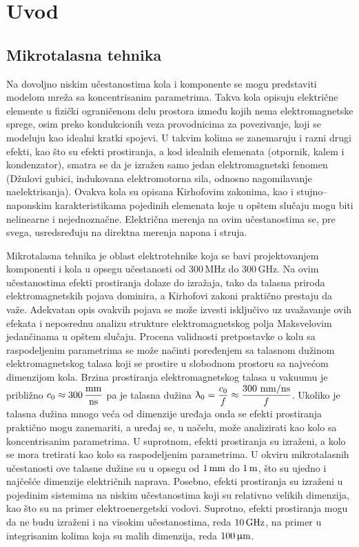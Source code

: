 \documentclass[a4paper, 12pt, diplomski]{etf}
\renewcommand{\unit}[1]{\,{\rm #1}}   %
\newcommand{\DS}{\displaystyle}
\begin{document}
\newpage

\section{Uvod}
\subsection{Mikrotalasna tehnika}
Na dovoljno niskim učestanostima kola i komponente se mogu predstaviti modelom mreža sa koncentrisanim 
parametrima. Takva kola opisuju električne elemente u fizički ograničenom delu prostora između kojih nema elektromagnetske sprege, osim preko kondukcionih veza provodnicima za povezivanje, koji se
modeluju kao idealni kratki spojevi. 
U takvim kolima se zanemaruju i razni drugi 
efekti, kao što su efekti prostiranja, a kod 
idealnih elemenata (otpornik, kalem i 
kondenzator), smatra se da je izražen samo 
jedan elektromagnetski fenomen (Džulovi gubici, indukovana elektromotorna sila, odnosno nagomilavanje naelektrisanja).
Ovakva kola su opisana 
Kirhofovim zakonima, kao i stujno--naponskim karakteristikama
pojedinih elemenata koje u opštem slučaju mogu biti 
nelinearne i nejednoznačne. Električna merenja na ovim učestanostima 
se, pre svega, usredsređuju na direktna merenja napona i struja.

Mikrotalasna tehnika je oblast elektrotehnike koja se bavi projektovanjem komponenti
i kola u opsegu učestanosti od 300\,MHz do 300\,GHz. Na ovim učestanostima
efekti prostiranja dolaze do izražaja, tako da talasna priroda elektromagnetskih pojava dominira,
a Kirhofovi zakoni praktično prestaju da važe. Adekvatan opis ovakvih pojava se može izvesti isključivo 
uz uvažavanje ovih efekata i neposrednu analizu strukture elektromagnetskog polja Maksvelovim 
jedančinama u opštem slučaju. 
Procena validnosti pretpostavke o kolu sa raspodeljenim parametrima se može načinti poređenjem sa talasnom dužinom elektromagnetskog talasa koji se prostire u slobodnom prostoru sa najvećom dimenzijom kola.
Brzina prostiranja elektromagnetskog talasa u vakuumu je približno $c_0 \approx 300\unit{\dfrac{mm}{ns}}$
pa je talasna dužina 
$\DS \uplambda_0 = \frac{c_0}{f} \approx \frac{300
\,{\unit{mm/ns}}}{f}$.
Ukoliko je talasna dužina mnogo veća od dimenzije uređaja onda se efekti prostiranja praktično mogu zanemariti,
a uređaj se, u načelu, može analizirati kao kolo sa koncentrisanim parametrima. U suprotnom, efekti
prostiranja su izraženi, a kolo se mora tretirati kao kolo sa raspodeljenim parametrima. U okviru mikrotalasnih učestanosti ove talasne dužine su u
 opsegu od $1\unit{mm}$ do $1\unit{m}$, što su ujedno i najčešće dimenzije 
 električnih naprava. Posebno, efekti prostiranja su izraženi u pojedinim
 sistemima na niskim učestanostima koji su relativno velikih dimenzija, 
 kao 
 što su na primer 
elektroenergetski vodovi.
Suprotno, efekti prostiranja mogu 
 da ne budu izraženi i na visokim učestanostima, reda $10\unit{GHz}$, na 
 primer u integrisanim kolima koja su malih dimenzija, reda $100\unit{\upmu m}$.
 \cite{djordjevic-mw, pozar}
\end{document}
